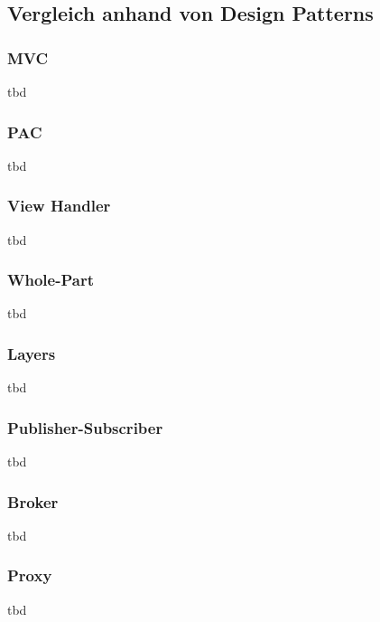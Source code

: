 \subsection{Vergleich anhand von Design Patterns}
\subsubsection{MVC}
\color{red}
tbd
\color{black}

\subsubsection{PAC}
\color{red}
tbd
\color{black}

\subsubsection{View Handler}
\color{red}
tbd
\color{black}

\subsubsection{Whole-Part}
\color{red}
tbd
\color{black}

\subsubsection{Layers}
\color{red}
tbd
\color{black}

\subsubsection{Publisher-Subscriber}
\color{red}
tbd
\color{black}

\subsubsection{Broker}
\color{red}
tbd
\color{black}

\subsubsection{Proxy}
\color{red}
tbd
\color{black}
